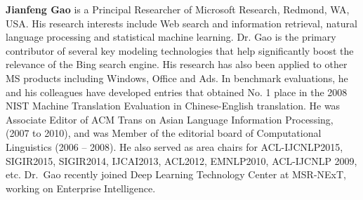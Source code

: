 \begin{bio}
  {\bfseries Jianfeng Gao} is a Principal Researcher of Microsoft
  Research, Redmond, WA, USA. His research interests include Web
  search and information retrieval, natural language processing and
  statistical machine learning. Dr. Gao is the primary contributor of
  several key modeling technologies that help significantly boost the
  relevance of the Bing search engine. His research has also been
  applied to other MS products including Windows, Office and Ads. In
  benchmark evaluations, he and his colleagues have developed entries
  that obtained No. 1 place in the 2008 NIST Machine Translation
  Evaluation in Chinese-English translation. He was Associate Editor
  of ACM Trans on Asian Language Information Processing, (2007 to
  2010), and was Member of the editorial board of Computational
  Linguistics (2006 – 2008). He also served as area chairs for
  ACL-IJCNLP2015, SIGIR2015, SIGIR2014, IJCAI2013, ACL2012, EMNLP2010,
  ACL-IJCNLP 2009, etc. Dr.\ Gao recently joined Deep Learning
  Technology Center at MSR-NExT, working on Enterprise Intelligence.
\end{bio}

